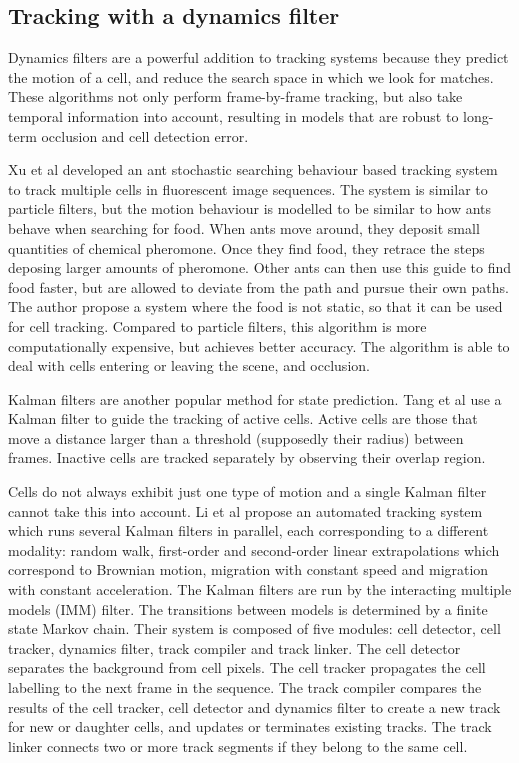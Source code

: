 \subsection{Tracking with a dynamics filter \statusfirstdraft}
Dynamics filters are a powerful addition to tracking systems because they predict the motion of a cell, and reduce the search space in which we look for matches. These algorithms not only perform frame-by-frame tracking, but also take temporal information into account, resulting in models that are robust to long-term occlusion and cell detection error.

Xu et al \cite{xu12} developed an ant stochastic searching behaviour based tracking system to track multiple cells in fluorescent image sequences. The system is similar to particle filters, but the motion behaviour is modelled to be similar to how ants behave when searching for food. When ants move around, they deposit small quantities of chemical pheromone. Once they find food, they retrace the steps deposing larger amounts of pheromone. Other ants can then use this guide to find food faster, but are allowed to deviate from the path and pursue their own paths. The author propose a system where the food is not static, so that it can be used for cell tracking. Compared to particle filters, this algorithm is more computationally expensive, but achieves better accuracy. The algorithm is able to deal with cells entering or leaving the scene, and occlusion.

Kalman filters are another popular method for state prediction. Tang et al \cite{tang} use a Kalman filter to guide the tracking of active cells. Active cells are those that move a distance larger than a threshold (supposedly their radius) between frames. Inactive cells are tracked separately by observing their overlap region.

Cells do not always exhibit just one type of motion and a single Kalman filter cannot take this into account. Li et al \cite{li07} propose an automated tracking system which runs several Kalman filters in parallel, each corresponding to a different modality: random walk, first-order and second-order linear extrapolations which correspond to Brownian motion, migration with constant speed and migration with constant acceleration. The Kalman filters are run by the interacting multiple models (IMM) filter. The transitions between models is determined by a finite state Markov chain. Their system is composed of five modules: cell detector, cell tracker, dynamics filter, track compiler and track linker. The cell detector separates the background from cell pixels. The cell tracker propagates the cell labelling to the next frame in the sequence. The track compiler compares the results of the cell tracker, cell detector and dynamics filter to create a new track for new or daughter cells, and updates or terminates existing tracks. The track linker connects two or more track segments if they belong to the same cell.

